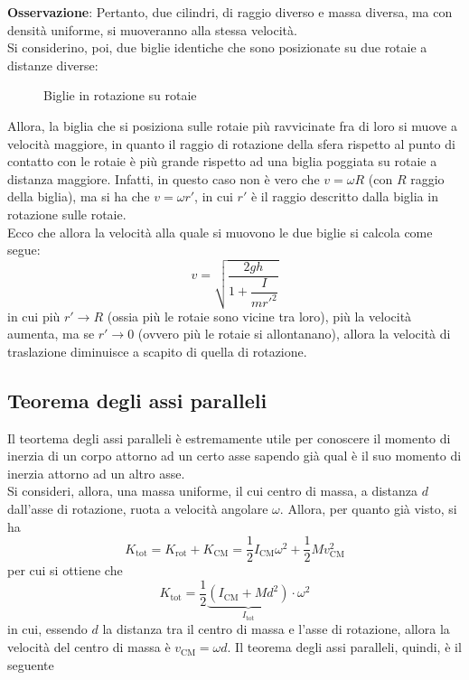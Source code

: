 \documentclass[a4paper]{extarticle}
\begin{document}
\vspace{1em}
\noindent
\textbf{Osservazione}: Pertanto, due cilindri, di raggio diverso e massa diversa, ma con densità uniforme, si muoveranno alla stessa velocità.\\
Si considerino, poi, due biglie identiche che sono posizionate su due rotaie a distanze diverse:

\begin{figure}[H]
  \centering
  \caption{Biglie in rotazione su rotaie}
  \label{fig:biglie_rotazione_rotaie}
\end{figure}

\noindent
Allora, la biglia che si posiziona sulle rotaie più ravvicinate fra di loro si muove a velocità maggiore, in quanto il raggio di rotazione della sfera rispetto al punto di contatto con le rotaie è più grande rispetto ad una biglia poggiata su rotaie a distanza maggiore. Infatti, in questo caso non è vero che $v = \omega R$ (con $R$ raggio della biglia), ma si ha che $v=\omega r'$, in cui $r'$ è il raggio descritto dalla biglia in rotazione sulle rotaie.\\
Ecco che allora la velocità alla quale si muovono le due biglie si calcola come segue:
\[\boxed{v=\sqrt{\frac{2gh}{1 + \dfrac{I}{m r'^2}}}}\]
in cui più $r' \to R$ (ossia più le rotaie sono vicine tra loro), più la velocità aumenta, ma se $r' \to 0$ (ovvero più le rotaie si allontanano), allora la velocità di traslazione diminuisce a scapito di quella di rotazione.

\vspace{1em}
\subsection{Teorema degli assi paralleli}
Il teortema degli assi paralleli è estremamente utile per conoscere il momento di inerzia di un corpo attorno ad un certo asse sapendo già qual è il suo momento di inerzia attorno ad un altro asse.\\
Si consideri, allora, una massa uniforme, il cui centro di massa, a distanza $d$ dall'asse di rotazione, ruota a velocità angolare $\omega$. Allora, per quanto già visto, si ha
\[K_{\text{tot}} = K_{\text{rot}} + K_{\text{CM}} = \frac{1}{2}I_{\text{CM}} \omega^2 + \frac{1}{2}M v_{\text{CM}}^2\]
per cui si ottiene che
\[K_{\text{tot}}=\frac{1}{2} \underbrace{\left(I_{\text{CM}} + Md^2\right)}_{I_{\text{tot}}} \cdot \omega^2\]
in cui, essendo $d$ la distanza tra il centro di massa e l'asse di rotazione, allora la velocità del centro di massa è $v_{\text{CM}}=\omega d$. Il teorema degli assi paralleli, quindi, è il seguente
\end{document}

